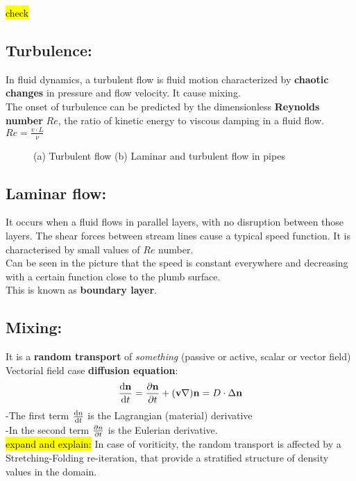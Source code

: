 \documentclass[a4paper,11pt]{article}
\newcommand{\cic}[1]{\mathbf{#1}}
\begin{document}
\hl{check}

\subsection {Turbulence:} 
In fluid dynamics, a turbulent flow is fluid motion characterized by \textbf{chaotic changes} in pressure and flow velocity. It cause mixing.\\
The onset of turbulence can be predicted by the dimensionless \textbf{Reynolds number} $Re$, the ratio of kinetic energy to viscous damping in a fluid flow. $Re=\frac{v \cdot L}{\nu}$

\begin{figure}
    \centering
    \caption{(a) Turbulent flow (b) Laminar and turbulent flow in pipes}
\end{figure}


\subsection{Laminar flow:}
 It occurs when a fluid flows in parallel layers, with no disruption between those layers.
 The shear forces between stream lines cause a typical speed function. 
 It is characterised by small values of $Re$ number.\\
Can be seen in the picture that the speed is constant everywhere and decreasing with a certain function close to the plumb surface. \\
 This is known as \textbf{boundary layer}.

\subsection{Mixing:}
It is a \textbf{random transport} of \emph{something} (passive or active, scalar or vector field) \\ %
Vectorial field case \textbf{diffusion equation}:
\[ \dv{\cic{n}}{t} =\pdv{\cic{n}}{t}+(\cic{v} \nabla)\cic{n} = D \cdot \Delta \cic{n} \]
-The first term $\dv{n}{t}$ is the Lagrangian (material) derivative \\
-In the second term $\pdv{n}{t}$ is the Eulerian derivative. \\

\hl{expand and explain:} In case of voriticity, the random transport is affected by a Stretching-Folding re-iteration, that provide a stratified structure of density values in the domain.
\end{document}
